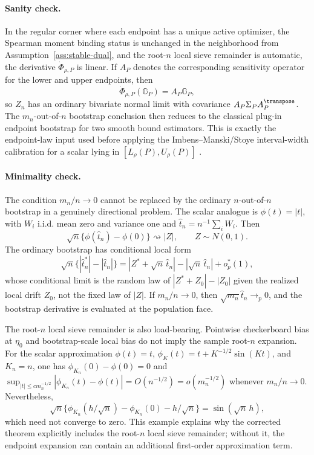 \paragraph{Sanity check.}
In the regular corner where each endpoint has a unique active optimizer, the Spearman moment binding status is unchanged in the neighborhood from Assumption~\ref{ass:stable-dual}, and the root-\(n\) local sieve remainder is automatic, the derivative \(\dot\Phi_{\rho,P}\) is linear.  If \(A_P\) denotes the corresponding sensitivity operator for the lower and upper endpoints, then
\[
\dot\Phi_{\rho,P}(\mathbb G_P)=A_P\mathbb G_P,
\]
so \(Z_n\) has an ordinary bivariate normal limit with covariance \(A_P\Sigma_PA_P^{\transpose}\).  The \(m_n\)-out-of-\(n\) bootstrap conclusion then reduces to the classical plug-in endpoint bootstrap for two smooth bound estimators.  This is exactly the endpoint-law input used before applying the Imbens--Manski/Stoye interval-width calibration for a scalar lying in \([L_\rho(P),U_\rho(P)]\) \cite{Stoye2009MoreCI}.

\paragraph{Minimality check.}
The condition \(m_n/n\to0\) cannot be replaced by the ordinary \(n\)-out-of-\(n\) bootstrap in a genuinely directional problem.  The scalar analogue is \(\phi(t)=|t|\), with \(W_i\) i.i.d. mean zero and variance one and \(\widehat t_n=n^{-1}\sum_iW_i\).  Then
\[
\sqrt n\{\phi(\widehat t_n)-\phi(0)\}\rightsquigarrow |Z|,
\qquad Z\sim N(0,1).
\]
The ordinary bootstrap has conditional local form
\[
\sqrt n\{|\widehat t_n^*|-|\widehat t_n|\}
=|Z^*+\sqrt n\,\widehat t_n|-|\sqrt n\,\widehat t_n|+o_p^*(1),
\]
whose conditional limit is the random law of \(|Z^*+Z_0|-|Z_0|\) given the realized local drift \(Z_0\), not the fixed law of \(|Z|\).  If \(m_n/n\to0\), then \(\sqrt{m_n}\widehat t_n\to_p0\), and the bootstrap derivative is evaluated at the population face.

The root-\(n\) local sieve remainder is also load-bearing.  Pointwise checkerboard bias at \(\eta_0\) and bootstrap-scale local bias do not imply the sample root-\(n\) expansion.  For the scalar approximation \(\phi(t)=t\), \(\phi_K(t)=t+K^{-1/2}\sin(Kt)\), and \(K_n=n\), one has \(\phi_{K_n}(0)-\phi(0)=0\) and \(\sup_{|t|\le c m_n^{-1/2}}|\phi_{K_n}(t)-\phi(t)|=O(n^{-1/2})=o(m_n^{-1/2})\) whenever \(m_n/n\to0\).  Nevertheless,
\[
\sqrt n\{\phi_{K_n}(h/\sqrt n)-\phi_{K_n}(0)-h/\sqrt n\}
=\sin(\sqrt n\,h),
\]
which need not converge to zero.  This example explains why the corrected theorem explicitly includes the root-\(n\) local sieve remainder; without it, the endpoint expansion can contain an additional first-order approximation term.
